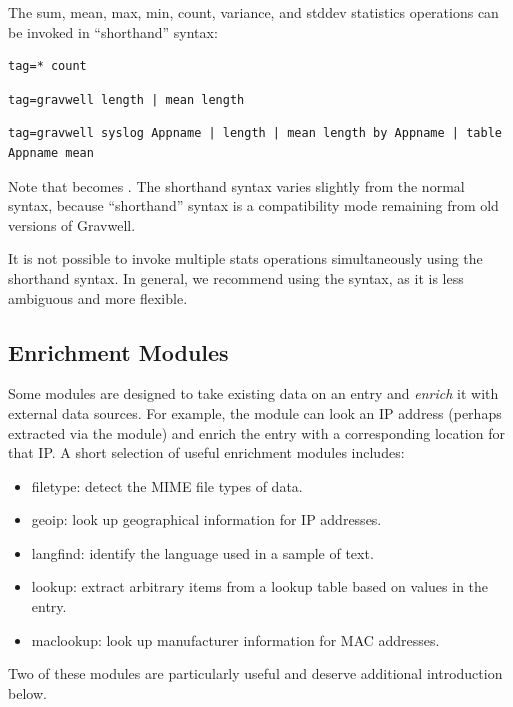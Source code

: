 The sum, mean, max, min, count, variance, and stddev statistics operations can be invoked in ``shorthand'' syntax:

\begin{verbatim}
tag=* count
\end{verbatim}

\begin{verbatim}
tag=gravwell length | mean length
\end{verbatim}

\begin{verbatim}
tag=gravwell syslog Appname | length | mean length by Appname | table Appname mean
\end{verbatim}

Note that  becomes . The shorthand syntax varies slightly from the normal syntax, because ``shorthand'' syntax is a compatibility mode remaining from old versions of Gravwell.

It is not possible to invoke multiple stats operations simultaneously using the shorthand syntax. In general, we recommend using the  syntax, as it is less ambiguous and more flexible.

\clearpage
\subsection{Enrichment Modules}

Some modules are designed to take existing data on an entry and \emph{enrich} it with external data sources. For example, the  module can look an IP address (perhaps extracted via the  module) and enrich the entry with a corresponding location for that IP. A short selection of useful enrichment modules includes:

\begin{itemize}
\item filetype: detect the MIME file types of data.
\item geoip: look up geographical information for IP addresses.
\item langfind: identify the language used in a sample of text.
\item lookup: extract arbitrary items from a lookup table based on values in the entry.
\item maclookup: look up manufacturer information for MAC addresses.
\end{itemize}

Two of these modules are particularly useful and deserve additional introduction below.

